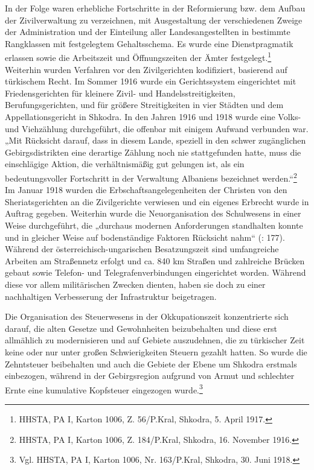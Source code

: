 In der Folge waren erhebliche Fortschritte in der Reformierung bzw. dem Aufbau der Zivilverwaltung zu verzeichnen, mit Ausgestaltung der verschiedenen Zweige der Administration und der Einteilung aller Landesangestellten in bestimmte Rangklassen mit festgelegtem Gehaltsschema. Es wurde eine Dienstpragmatik erlassen sowie die Arbeitszeit und Öffnungszeiten der Ämter festgelegt.\footnote{HHSTA, PA I, Karton 1006, Z. 56/P.Kral, Shkodra, 5. April 1917. } Weiterhin wurden Verfahren vor den Zivilgerichten kodifiziert, basierend auf türkischem Recht. Im Sommer 1916 wurde ein Gerichtssystem eingerichtet mit Friedensgerichten für kleinere Zivil- und Handelsstreitigkeiten, Berufungsgerichten, und für größere Streitigkeiten in vier Städten und dem Appellationsgericht in Shkodra. In den Jahren 1916 und 1918 wurde eine Volks- und Viehzählung durchgeführt, die offenbar mit einigem Aufwand verbunden war. „Mit Rücksicht darauf, dass in diesem Lande, speziell in den schwer zugänglichen Gebirgsdistrikten eine derartige Zählung noch nie stattgefunden hatte, muss die einschlägige Aktion, die verhältnismäßig gut gelungen ist, als ein bedeutungsvoller Fortschritt in der Verwaltung Albaniens bezeichnet werden.“\footnote{HHSTA, PA I, Karton 1006, Z. 184/P.Kral, Shkodra, 16. November 1916.} Im Januar 1918 wurden die Erbschaftsangelegenheiten der Christen von den Sheriatsgerichten an die Zivilgerichte verwiesen und ein eigenes Erbrecht wurde in Auftrag gegeben. Weiterhin wurde die Neuorganisation des Schulwesens in einer Weise durchgeführt, die „durchaus modernen Anforderungen standhalten konnte und in gleicher Weise auf bodenständige Faktoren Rücksicht nahm“ (\cite{schwanke}: 177). Während der österreichisch-ungarischen Besatzungszeit sind umfangreiche Arbeiten am Straßennetz erfolgt und ca. 840 km Straßen und zahlreiche Brücken gebaut sowie Telefon- und Telegrafenverbindungen eingerichtet worden. Während diese vor allem militärischen Zwecken dienten, haben sie doch zu einer nachhaltigen Verbesserung der Infrastruktur beigetragen.\par
Die Organisation des Steuerwesens in der Okkupationszeit konzentrierte sich darauf, die alten Gesetze und Gewohnheiten beizubehalten und diese erst allmählich zu modernisieren und auf Gebiete auszudehnen, die zu türkischer Zeit keine oder nur unter großen Schwierigkeiten Steuern gezahlt hatten. So wurde die Zehntsteuer beibehalten und auch die Gebiete der Ebene um Shkodra erstmals einbezogen, während in der Gebirgsregion aufgrund von Armut und schlechter Ernte eine kumulative Kopfsteuer eingezogen wurde.\footnote{Vgl. HHSTA, PA I, Karton 1006, Nr. 163/P.Kral, Shkodra, 30. Juni 1918.}\par
